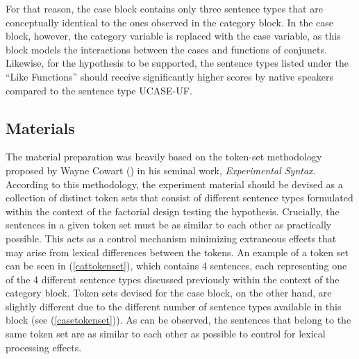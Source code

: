 For that reason, the case block contains only three sentence types that are conceptually identical to the ones observed in the category block. In the case block, however, the category variable is replaced with the case variable, as this block models the interactions between the cases and functions of conjuncts. Likewise, for the hypothesis to be supported, the sentence types listed under the ``Like Functions'' should receive significantly higher scores by native speakers compared to the sentence type UCASE-UF.

\subsection{Materials}

The material preparation was heavily based on the token-set methodology proposed by Wayne Cowart (\citeyear{cowart1997}) in his seminal work, \textit{Experimental Syntax}. According to this methodology, the experiment material should be devised as a collection of distinct token sets that consist of different sentence types formulated within the context of the factorial design testing the hypothesis. Crucially, the sentences in a given token set must be as similar to each other as practically possible. This acts as a control mechanism minimizing extraneous effects that may arise from lexical differences between the tokens. An example of a token set can be seen in (\ref{cattokenset}), which contains 4 sentences, each representing one of the 4 different sentence types discussed previously within the context of the category block. Token sets devised for the case block, on the other hand, are slightly different due to the different number of sentence types available in this block (see (\ref{casetokenset})). As can be observed, the sentences that belong to the same token set are as similar to each other as possible to control for lexical processing effects.

